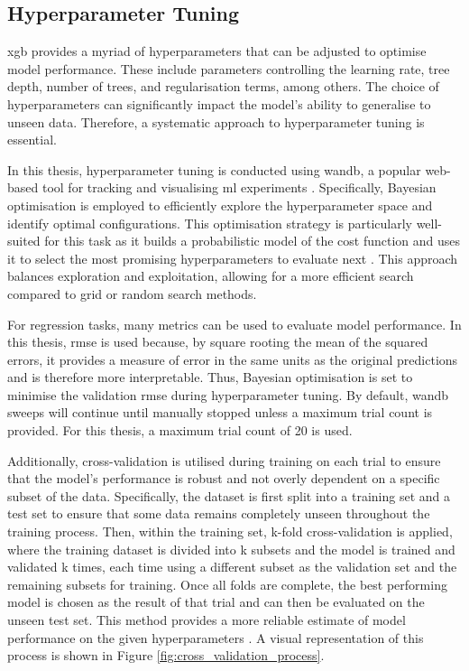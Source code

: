 \subsection{Hyperparameter Tuning}

\acrshort{xgb} provides a myriad of hyperparameters that can be adjusted to optimise model performance. These include parameters controlling the learning rate, tree depth, number of trees, and regularisation terms, among others. The choice of hyperparameters can significantly impact the model's ability to generalise to unseen data. Therefore, a systematic approach to hyperparameter tuning is essential. 

In this thesis, hyperparameter tuning is conducted using \acrfull{wandb}, a popular web-based tool for tracking and visualising \acrshort{ml} experiments \citep{Biewald2020}. Specifically, Bayesian optimisation is employed to efficiently explore the hyperparameter space and identify optimal configurations. This optimisation strategy is particularly well-suited for this task as it builds a probabilistic model of the cost function and uses it to select the most promising hyperparameters to evaluate next \citep{Mockus1994,Shahriari2016}. This approach balances exploration and exploitation, allowing for a more efficient search compared to grid or random search methods. 

For regression tasks, many metrics can be used to evaluate model performance. In this thesis, \acrfull{rmse} is used because, by square rooting the mean of the squared errors, it provides a measure of error in the same units as the original predictions and is therefore more interpretable. Thus, Bayesian optimisation is set to minimise the validation \acrshort{rmse} during hyperparameter tuning. By default, \acrshort{wandb} sweeps will continue until manually stopped unless a maximum trial count is provided. For this thesis, a maximum trial count of 20 is used.

Additionally, cross-validation is utilised during training on each trial to ensure that the model's performance is robust and not overly dependent on a specific subset of the data. Specifically, the dataset is first split into a training set and a test set to ensure that some data remains completely unseen throughout the training process. Then, within the training set, k-fold cross-validation is applied, where the training dataset is divided into k subsets and the model is trained and validated k times, each time using a different subset as the validation set and the remaining subsets for training. Once all folds are complete, the best performing model is chosen as the result of that trial and can then be evaluated on the unseen test set. This method provides a more reliable estimate of model performance on the given hyperparameters \citep{Lopez2023,Singh2021}. A visual representation of this process is shown in Figure \ref{fig:cross_validation_process}.

